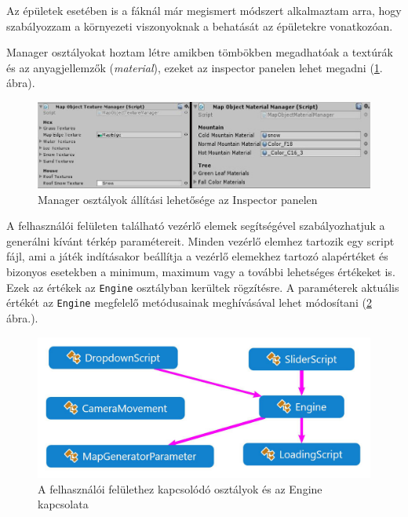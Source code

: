 Az épületek esetében is a fáknál már megismert módszert alkalmaztam arra, hogy szabályozzam a környezeti viszonyoknak a behatását az épületekre vonatkozóan.

Manager osztályokat hoztam létre amikben tömbökben megadhatóak a textúrák és az anyagjellemzők (\textit{material}), ezeket az inspector panelen lehet megadni (\ref{fig:Managers}. ábra).

\begin{figure}[h!]
\centering
\includegraphics[scale=0.45]{kepek/Managers.jpg}
\caption{Manager osztályok állítási lehetősége az Inspector panelen}
\label{fig:Managers}
\end{figure}


A felhasználói felületen található vezérlő elemek segítségével szabályozhatjuk a generálni kívánt térkép paramétereit. Minden vezérlő elemhez tartozik egy script fájl, ami a játék indításakor beállítja a vezérlő elemekhez tartozó alapértéket és bizonyos esetekben a minimum, maximum vagy a további lehetséges értékeket is. Ezek az értékek az \texttt{Engine} osztályban kerültek rögzítésre. A paraméterek aktuális értékét az \texttt{Engine} megfelelő metódusainak meghívásával lehet módosítani (\ref{fig:UI} ábra.).

\begin{figure}[h!]
\centering
\includegraphics[scale=0.3]{kepek/White_UI.JPG}
\caption{A felhasználói felülethez kapcsolódó osztályok és az Engine kapcsolata}
\label{fig:UI}
\end{figure}

